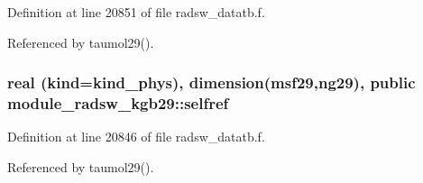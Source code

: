 Definition at line 20851 of file radsw\+\_\+datatb.\+f.



Referenced by taumol29().

\subsubsection[{\texorpdfstring{selfref}{selfref}}]{\setlength{\rightskip}{0pt plus 5cm}real (kind=kind\+\_\+phys), dimension({\bf msf29},ng29), public module\+\_\+radsw\+\_\+kgb29\+::selfref}\hypertarget{namespacemodule__radsw__kgb29_a468e2dd6001734d10784c8fb7b5df4e3}{}\label{namespacemodule__radsw__kgb29_a468e2dd6001734d10784c8fb7b5df4e3}


Definition at line 20846 of file radsw\+\_\+datatb.\+f.



Referenced by taumol29().

